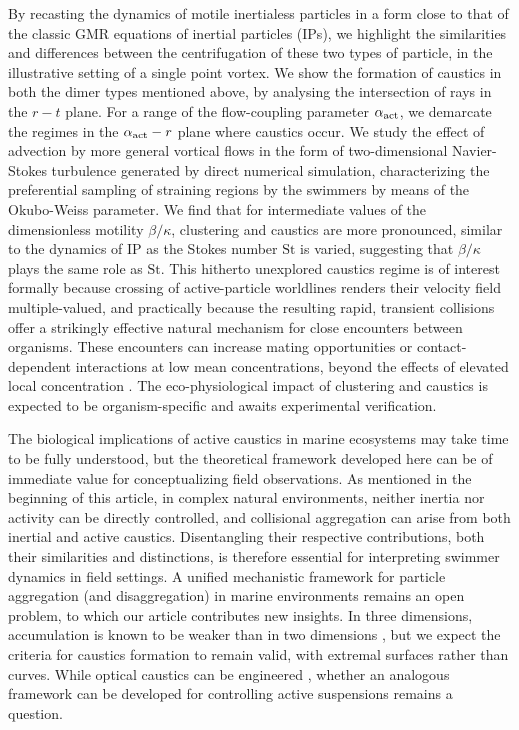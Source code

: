 \documentclass[../Rajarshi-thesis-draft.tex]{subfiles}
\begin{document}
By recasting the dynamics of motile inertialess particles in a form close to that of the classic GMR \cite{gatignol1983,MR83} equations of inertial particles (IPs), we highlight the similarities and differences between the centrifugation of these two types of particle, in the illustrative setting of a single point vortex. We show the formation of caustics in both the dimer types mentioned above, by analysing the intersection of rays in the $r-t$ plane. For a range of the flow-coupling parameter $\alpha_{\rm act}$, we demarcate the regimes in the ${\alpha_{\rm act}}-r$ plane where caustics occur. We study the effect of advection by more general vortical flows in the form of two-dimensional Navier-Stokes turbulence generated by direct numerical simulation, characterizing the preferential sampling of straining regions by the swimmers by means of the Okubo-Weiss parameter. We find that for intermediate values of the dimensionless motility $\beta/\kappa$, clustering and caustics are more pronounced, similar to the dynamics of IP as the Stokes number $\text{St}$ is varied, suggesting that $\beta/\kappa$ plays the same role as $\text{St}$. This hitherto unexplored caustics regime is of interest formally because crossing of active-particle worldlines renders their velocity field multiple-valued, and practically because the resulting rapid, transient collisions offer a strikingly effective natural mechanism for close encounters between organisms. These encounters can increase mating opportunities or contact-dependent interactions at low mean concentrations, beyond the effects of elevated local concentration \cite{Durham2013, Zhan2014}. The eco-physiological impact of clustering and caustics is expected to be organism-specific and awaits experimental verification.

The biological implications of active caustics in marine ecosystems may take time to be fully understood, but the theoretical framework developed here can be of immediate value for conceptualizing field observations. As mentioned in the beginning of this article, in complex natural environments, neither inertia nor activity can be directly controlled, and collisional aggregation \cite{pumir2016} can arise from both inertial and active caustics. Disentangling their respective contributions, both their similarities and distinctions, is therefore essential for interpreting swimmer dynamics in field settings. A unified mechanistic framework for particle aggregation (and disaggregation) in marine environments \cite{Burd2009} remains an open problem, 
to which our article contributes new insights. In three dimensions, accumulation is known to be weaker than in two dimensions \cite{Zhan2014}, but we expect the criteria for caustics formation to remain valid, with extremal surfaces rather than curves. While optical caustics can be engineered \cite{zhou2024arbitrary}, whether an analogous framework can be developed for controlling active suspensions remains a question.
\end{document}

